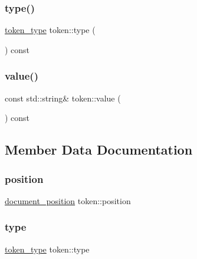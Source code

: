 \subsubsection{\texorpdfstring{type()}{type()}}
{\footnotesize\ttfamily \mbox{\hyperlink{token_8h_afe5ef662303b6b710ea6ee1a944bad0d}{token\+\_\+type}} token\+::type (\begin{DoxyParamCaption}{ }\end{DoxyParamCaption}) const\hspace{0.3cm}{\ttfamily [inline]}}

\mbox{\label{classtoken_a428b079df3ca8461819f181a3e27504e}} 
\subsubsection{\texorpdfstring{value()}{value()}}
{\footnotesize\ttfamily const std\+::string\& token\+::value (\begin{DoxyParamCaption}{ }\end{DoxyParamCaption}) const\hspace{0.3cm}{\ttfamily [inline]}}



\subsection{Member Data Documentation}
\mbox{\label{classtoken_a3bd56df2d1b1afe17b696ffd6c2d7482}} 
\subsubsection{\texorpdfstring{position}{position}}
{\footnotesize\ttfamily \mbox{\hyperlink{structdocument__position}{document\+\_\+position}} token\+::position}

\mbox{\label{classtoken_ae4872e33fcec00c59c994c4c9ee3a1f5}} 
\subsubsection{\texorpdfstring{type}{type}}
{\footnotesize\ttfamily \mbox{\hyperlink{token_8h_afe5ef662303b6b710ea6ee1a944bad0d}{token\+\_\+type}} token\+::type}


